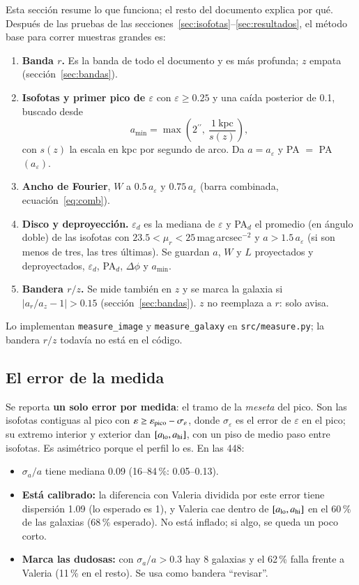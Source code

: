 \documentclass[11pt,a4paper]{article}
\newcommand{\as}{\ensuremath{^{\prime\prime}}}
\newcommand{\aeps}{a_\varepsilon}
\newcommand{\code}[1]{\texttt{#1}}
\begin{document}
Esta sección resume lo que funciona; el resto del documento explica por qué. Después de las pruebas de las
secciones~\ref{sec:isofotas}--\ref{sec:resultados}, el método base para correr muestras grandes es:
\begin{enumerate}
\item \textbf{Banda $r$.} Es la banda de todo el documento y es más profunda; $z$ empata (sección~\ref{sec:bandas}).
\item \textbf{Isofotas y primer pico de $\varepsilon$} con $\varepsilon \ge 0.25$ y una caída posterior de 0.1, buscado
desde
\begin{equation}\label{eq:amin}
a_{\min} = \max\!\left(2\as,\ \frac{1\ \mathrm{kpc}}{s(z)}\right),
\end{equation}
con $s(z)$ la escala en kpc por segundo de arco. Da $a = \aeps$ y PA $=$ PA$(\aeps)$.
\item \textbf{Ancho de Fourier}, $W$ a $0.5\,\aeps$ y $0.75\,\aeps$ (barra combinada, ecuación~\ref{eq:comb}).
\item \textbf{Disco y deproyección.} $\varepsilon_d$ es la mediana de $\varepsilon$ y PA$_d$ el promedio (en ángulo doble)
de las isofotas con $23.5 < \mu_r < 25$\,mag\,arcsec$^{-2}$ y $a > 1.5\,\aeps$ (si son menos de tres, las tres
últimas). Se guardan $a$, $W$ y $L$ proyectados y deproyectados, $\varepsilon_d$, PA$_d$, $\Delta\phi$ y $a_{\min}$.
\item \textbf{Bandera $r/z$.} Se mide también en $z$ y se marca la galaxia si $|a_r/a_z - 1| > 0.15$
(sección~\ref{sec:bandas}). $z$ no reemplaza a $r$: solo avisa.
\end{enumerate}
Lo implementan \code{measure\_image} y \code{measure\_galaxy} en \code{src/measure.py}; la bandera $r/z$ todavía no
está en el código.

\subsection{El error de la medida}\label{sec:error}

Se reporta \textbf{un solo error por medida}: el tramo de la \emph{meseta} del pico. Son las isofotas contiguas
al pico con $\varepsilon \ge \varepsilon_{\rm pico} - \sigma_\varepsilon$, donde $\sigma_\varepsilon$ es el error de
$\varepsilon$ en el pico; su extremo interior y exterior dan $[a_{\rm lo}, a_{\rm hi}]$, con un piso de medio paso
entre isofotas. Es asimétrico porque el perfil lo es. En las 448:
\begin{itemize}
\item $\sigma_a/a$ tiene mediana 0.09 (16--84\,\%: 0.05--0.13).
\item \textbf{Está calibrado:} la diferencia con Valeria dividida por este error tiene dispersión 1.09 (lo
esperado es 1), y Valeria cae dentro de $[a_{\rm lo}, a_{\rm hi}]$ en el 60\,\% de las galaxias (68\,\% esperado).
No está inflado; si algo, se queda un poco corto.
\item \textbf{Marca las dudosas:} con $\sigma_a/a > 0.3$ hay 8 galaxias y el 62\,\% falla frente a Valeria
(11\,\% en el resto). Se usa como bandera ``revisar''.
\end{itemize}
\end{document}
